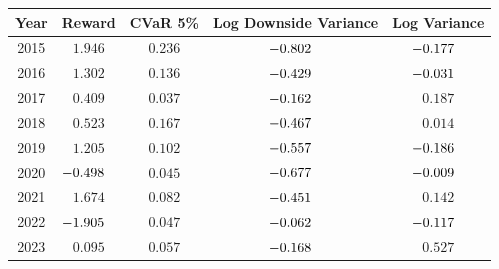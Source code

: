 \begingroup
\renewcommand{\arraystretch}{1.18}
\setlength{\tabcolsep}{8pt}
\begin{tabular}{@{}ccccc@{}}
\toprule
Year & Reward & CVaR 5\% & Log Downside Variance & Log Variance \\
\midrule
2015 & $1.946$\sym{***} & $0.236$ & $\mathllap{-}0.802$\sym{***} & $\mathllap{-}0.177$ \\
2016 & $1.302$\sym{***} & $0.136$\sym{*} & $\mathllap{-}0.429$\sym{***} & $\mathllap{-}0.031$ \\
2017 & $0.409$\sym{**} & $0.037$\sym{*} & $\mathllap{-}0.162$\sym{**} & $0.187$ \\
2018 & $0.523$ & $0.167$ & $\mathllap{-}0.467$\sym{*} & $0.014$ \\
2019 & $1.205$\sym{**} & $0.102$ & $\mathllap{-}0.557$\sym{***} & $\mathllap{-}0.186$ \\
2020 & $\mathllap{-}0.498$ & $0.045$ & $\mathllap{-}0.677$\sym{**} & $\mathllap{-}0.009$ \\
2021 & $1.674$\sym{***} & $0.082$\sym{**} & $\mathllap{-}0.451$\sym{***} & $0.142$ \\
2022 & $\mathllap{-}1.905$\sym{**} & $0.047$ & $\mathllap{-}0.062$ & $\mathllap{-}0.117$ \\
2023 & $0.095$ & $0.057$ & $\mathllap{-}0.168$\sym{**} & $0.527$\sym{***} \\
\bottomrule
\end{tabular}
\endgroup
